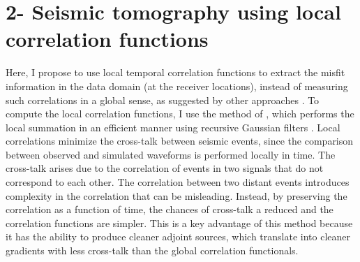 \section{2- Seismic tomography using local correlation functions }
Here, I propose to use local
temporal correlation functions to extract the misfit information in the data
domain (at the receiver locations), instead of measuring such correlations
in a global sense, as suggested by other approaches \citep{van2010correlation,simon,warner}. To compute the local
correlation functions, I use the method of \cite{hale2006}, which performs
the local summation in an efficient manner using recursive Gaussian filters
\citep{hale2006recursive}. Local correlations minimize the cross-talk between
seismic events, since the comparison between observed and simulated waveforms
is performed locally in time. The cross-talk arises due to the correlation of 
events in two signals that do not correspond to each other. The correlation between
two distant events introduces complexity in the correlation that can be misleading.
 Instead, by preserving the correlation as a function of time, the chances 
of cross-talk a reduced and the correlation functions are simpler. 
This is a key advantage of this method because
it has the ability to produce cleaner adjoint sources, which translate
into cleaner gradients with less cross-talk than the global correlation
functionals.






